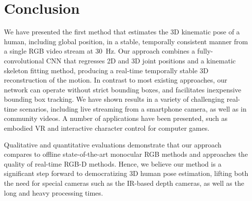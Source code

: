 \documentclass[acmtog]{acmart}
\newcommand{\change}[1]{{#1}}
\begin{document}
\section{Conclusion}
We have presented the first method that estimates the 3D \change{kinematic} pose of a human, including global position, \change{in a stable, temporally consistent manner} from a single RGB video stream at 30~Hz.
Our approach combines a fully-convolutional CNN that regresses 2D and 3D joint positions and a kinematic skeleton fitting method, producing a real-time temporally stable 3D reconstruction of the motion.
In contrast to most existing approaches, our network can operate without strict bounding boxes, and facilitates inexpensive bounding box tracking.
We have shown results in a variety of challenging real-time scenarios, including live streaming from a smartphone camera, as well as in community videos. 
A number of applications have been presented, such as embodied VR and interactive character control for computer games.

Qualitative and quantitative evaluations demonstrate that our approach compares to offline state-of-the-art monocular RGB methods and approaches the quality of real-time \mbox{RGB-D} methods. 
Hence, we believe our method is a significant step forward to democratizing 3D human pose estimation, lifting both the need for special cameras such as the IR-based depth cameras, as well as the long and heavy processing times.



\end{document}

